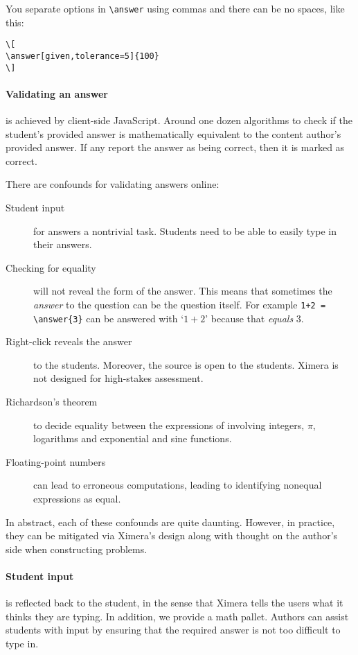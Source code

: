 \documentclass{ximera}
\begin{document}
\begin{warning}
  You separate options in \verb!\answer! using commas and there can be no
  spaces, like this:
  \begin{verbatim}
\[
\answer[given,tolerance=5]{100}
\]
\end{verbatim}
\end{warning}

\paragraph{Validating an answer} is achieved by client-side JavaScript. Around
one dozen algorithms to check if the student's provided
answer is mathematically equivalent to the content author's provided answer. If
any report the answer as being correct, then it is marked as correct.

\begin{warning}
  There are confounds for validating answers online:
  \begin{description}
    \item[Student input] for answers a nontrivial task. Students need to be
      able
      to easily type in their answers.
    \item[Checking for equality] will not reveal the form of the answer. This
      means that sometimes the \textit{answer} to the question can be the
      question
      itself. For example  \verb!1+2 = \answer{3}! can be answered with `$1+2$'
      because
      that \textit{equals} $3$.
    \item[Right-click reveals the answer] to the students. Moreover, the source
      is open to the students. Ximera is not designed for high-stakes
      assessment.
      \item[Richardson's theorem ]
      to decide equality between the expressions of involving integers, $\pi$,
      logarithms and exponential and sine functions.
    \item[Floating-point numbers] can lead to erroneous computations, leading
      to
      identifying nonequal expressions as equal.
  \end{description}
\end{warning}
In abstract, each of these confounds are quite daunting. However, in practice,
they can be mitigated via Ximera's design along with thought on the author's
side when constructing problems.

\paragraph{Student input} is reflected back to the student, in the sense that
Ximera tells the users what it thinks they are typing.
In addition, we provide a math
pallet. Authors can assist students with input by ensuring that the required
answer is not too difficult to type in.
\end{document}
